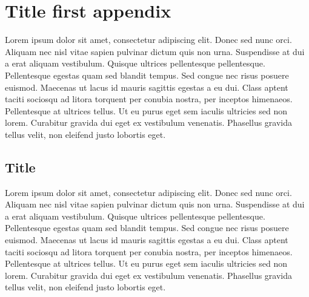 %
%
%
%

\chapter{Title first appendix}


Lorem ipsum dolor sit amet, consectetur adipiscing elit. Donec sed nunc orci.
Aliquam nec nisl vitae sapien pulvinar dictum quis non urna. Suspendisse at dui a
erat aliquam vestibulum. Quisque ultrices pellentesque pellentesque. Pellentesque
egestas quam sed blandit tempus. Sed congue nec risus posuere euismod. Maecenas ut
lacus id mauris sagittis egestas a eu dui. Class aptent taciti sociosqu ad
litora torquent per conubia nostra, per inceptos himenaeos. Pellentesque at
ultrices tellus. Ut eu purus eget sem iaculis ultricies sed non lorem. Curabitur
gravida dui eget ex vestibulum venenatis. Phasellus gravida tellus velit, non
eleifend justo lobortis eget.

\section{Title}
Lorem ipsum dolor sit amet, consectetur adipiscing elit. Donec sed nunc orci. Aliquam
nec nisl vitae sapien pulvinar dictum quis non urna. Suspendisse at dui a erat
aliquam vestibulum. Quisque ultrices pellentesque pellentesque. Pellentesque
egestas quam sed blandit tempus. Sed congue nec risus posuere euismod. Maecenas
ut lacus id mauris sagittis egestas a eu dui. Class aptent taciti sociosqu ad litora
torquent per conubia nostra, per inceptos himenaeos. Pellentesque at ultrices tellus.
Ut eu purus eget sem iaculis ultricies sed non lorem. Curabitur gravida dui eget
ex vestibulum venenatis. Phasellus gravida tellus velit, non eleifend justo lobortis
eget.

